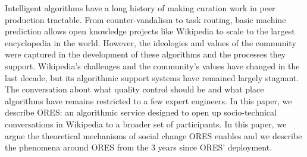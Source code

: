Intelligent algorithms have a long history of making curation work in peer production tractable.  From counter-vandalism to task routing, basic machine prediction allows open knowledge projects like Wikipedia to scale to the largest encyclopedia in the world.  However, the ideologies and values of the community were captured in the development of these algorithms and the processes they support.  Wikipedia's challenges and the community's values have changed in the last decade, but its algorithmic support systems have remained largely stagnant.  The conversation about what quality control should be and what place algorithms have remains restricted to a few expert engineers.  In this paper, we describe ORES: an algorithmic service designed to open up socio-technical conversations in Wikipedia to a broader set of participants.  In this paper, we argue the theoretical mechanisms of social change ORES enables and we describe the phenomena around ORES from the 3 years since ORES' deployment.
